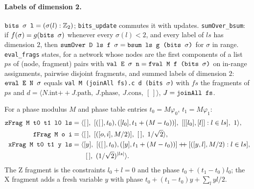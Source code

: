 \paragraph{Labels of dimension 2.} $\textnormal{\texttt{bits \ensuremath{\sigma} l}} = (\sigma(l) : \mathbb{Z}_{2})$; \textnormal{\texttt{bits\_\allowbreak{}update}} commutes
it with updates. \textnormal{\texttt{sumOver\_\allowbreak{}bsum}}: if $f(\sigma) = g(\textnormal{\texttt{bits \ensuremath{\sigma}}})$ whenever every $\sigma(l)<2$, and
every label of $ls$ has dimension $2$, then $\textnormal{\texttt{sumOver D ls f \ensuremath{\sigma}}} = \textnormal{\texttt{bsum ls g (\allowbreak{}bits \ensuremath{\sigma})}}$ for
$\sigma$ in range. \textnormal{\texttt{eval\_\allowbreak{}frags}} states, for a network whose nodes are the first components of
a list $ps$ of (node, fragment) pairs with $\textnormal{\texttt{val E \ensuremath{\sigma} n}} = \textnormal{\texttt{fval M f (\allowbreak{}bits \ensuremath{\sigma})}}$ on in-range
assignments, pairwise disjoint fragments, and summed labels of dimension $2$:
$\textnormal{\texttt{eval E N \ensuremath{\sigma}}}$ equals \textnormal{\texttt{val M (\allowbreak{}joinAll fs).\allowbreak{}c d (\allowbreak{}bits \ensuremath{\sigma})}} with $fs$ the fragments of $ps$
and $d = \langle N.\text{int}\mathbin{+\!\!+}J.\text{path},\ J.\text{phase},\ J.\text{cons},\ [\,]\rangle$,
$J = \textnormal{\texttt{joinAll fs}}$.

\begin{definition}\label{def:lean-pathsum-frag2}
For a phase modulus $M$ and phase table entries $t_0 = M\varphi_0$, $t_1 = M\varphi_1$:
\begin{align*}
\textnormal{\texttt{zFrag M t0 t1 l0 ls}} &= \langle[\,],\ [([\,],t_0), ([l_0], t_1+(M-t_0))],\ [[[l_0],[l]] : l\in ls],\ 1\rangle,\\
\textnormal{\texttt{fFrag M o i}} &= \langle[\,],\ [([o,i], M/2)],\ [\,],\ 1/\sqrt2\rangle,\\
\textnormal{\texttt{xFrag M t0 t1 y ls}} &= \langle[y],\ [([\,],t_0),([y],t_1+(M-t_0))]\mathbin{+\!\!+}[([y,l],M/2): l\in ls],\\
 &\qquad [\,],\ (1/\sqrt2)^{|ls|}\rangle .
\end{align*}
The Z fragment is the constraints $l_0+l=0$ and the phase $t_0+(t_1-t_0)l_0$; the X fragment adds a
fresh variable $y$ with phase $t_0+(t_1-t_0)y+\sum_l yl/2$.
\end{definition}

